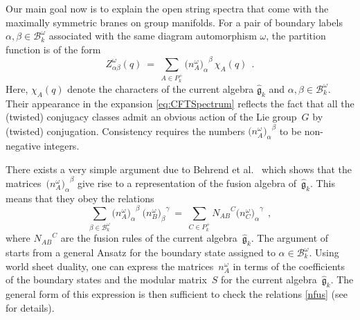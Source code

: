 \documentclass[12pt,a4paper]{article}
\newcommand{\mf}{\mathfrak} %
\newcommand{\mc}{\mathcal} %
\def\bL{\mc{B}} %
\def\areps{P_k^+} %
\def\tareps{\bL^\omega_k} %
\def\asg{{\hat{\mf{g}}}}
\def\a{\alpha}
\def\b{\beta}
\begin{document}
Our main goal now is to explain the open string spectra that come
with the maximally symmetric branes on group manifolds. For a pair 
of boundary labels $\alpha,\beta\in\tareps$ associated with the 
same diagram automorphism $\omega$, the partition function is of 
the form
\begin{equation}
  \label{eq:CFTSpectrum}
  Z^\omega_{\a \b}(q) \ 
  = \ \sum_{A\in\areps} {\bigl(n_A^\omega\bigr)_\alpha}^\beta\,\chi_A (q) \ \ . 
\end{equation}
Here, $\chi_A(q)$ denote the characters of the current algebra 
$\asg_k$ and $\a,\b\in\tareps$. Their appearance in the expansion 
\eqref{eq:CFTSpectrum} reflects the fact that all the (twisted) 
conjugacy classes admit an obvious action of the Lie group~$G$ 
by (twisted) conjugation. Consistency requires the numbers 
${\bigl(n_A^\omega\bigr)_\alpha}^\beta$ to be non-negative integers. 
\smallskip

There exists a very simple argument due to Behrend et
al.~\cite{Behrend:1999bn, Behrend:1998fd} 
which shows that the matrices~${\bigl(n_A^\omega\bigr)_\alpha}^\beta$ give 
rise to a representation of the fusion algebra of~$\asg_k$. This 
means that they obey the relations 
\begin{equation}
 \label{nfus}
  \sum_{\b\in\tareps} {\bigl(n_A^\omega\bigr)_\alpha}^\beta \ 
    {\bigl(n_B^\omega\bigr)_\beta}^\gamma \ = \ 
    \sum_{C\in\areps} {N_{AB}}^{C} {\bigl(n_C^\omega\bigr)_\alpha}^\gamma\ \ , 
\end{equation}
where ${N_{AB}}^C$ are the fusion rules of the current algebra~$\asg_k$. 
The argument of~\cite{Behrend:1999bn, Behrend:1998fd} starts from a general
Ansatz for the boundary state assigned to $\alpha\in\tareps$.
Using world sheet duality, one can express the matrices~$n_A^\omega$ in 
terms of the coefficients of the boundary states and the modular 
matrix~$S$ for the current algebra~$\asg_k$. The general form 
of this expression is then sufficient to check the relations \eqref{nfus}
(see \cite{Behrend:1999bn, Behrend:1998fd} for details). 
\smallskip
 
\end{document}
